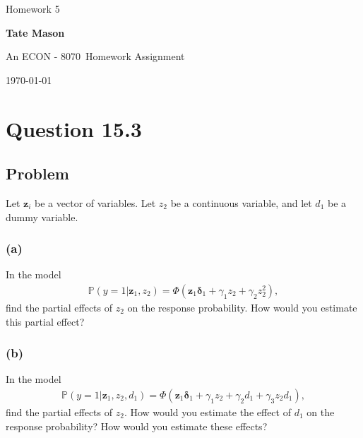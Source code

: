 \documentclass[10pt, a4paper]{article}
\newcommand\course{ECON - 8070}                            %
\newcommand\hwnumber{ 5}                                 %
\newcommand\Information{Tate Mason}                        %
\newcommand{\PP}{\mathbb P}
\begin{document}
  \begin{titlepage}
    \begin{center}
      \vspace*{3cm}
            
        \vspace{1cm}
        \huge
        Homework \hwnumber
            
        \vspace{1.5cm}
        \Large
            
        \textbf{\Information}                      %
            
        \vfill
        
        An \course \ Homework Assignment
            
        \vspace{1cm}
        \Large
        
        \today
            
    \end{center}
  \end{titlepage}

  \newpage
  \section*{Question 15.3}
    \subsection*{Problem}
      Let $\textbf{z}_i$ be a vector of variables. Let $z_2$ be a continuous variable, and let $d_1$ be a dummy variable.
      \subsubsection*{(a)}
        In the model
        \begin{gather*}
          \PP(y=1|\textbf{z}_1,z_2) = \Phi (\textbf{z}_1\boldsymbol{\delta}_1 + \gamma_1z_2 + \gamma_2z_2^2),
        \end{gather*}
        find the partial effects of $z_2$ on the response probability. How would you estimate this partial effect?
      \subsubsection*{(b)}
        In the model
        \begin{gather*}
          \PP(y=1|\textbf{z}_1, z_2, d_1) = \Phi(\textbf{z}_1\boldsymbol{\delta}_1 + \gamma_1z_2 + \gamma_2d_1 + \gamma_3z_2d_1),
        \end{gather*}
        find the partial effects of $z_2$. How would you estimate the effect of $d_1$ on the response probability? How would you estimate these effects?
\end{document}
